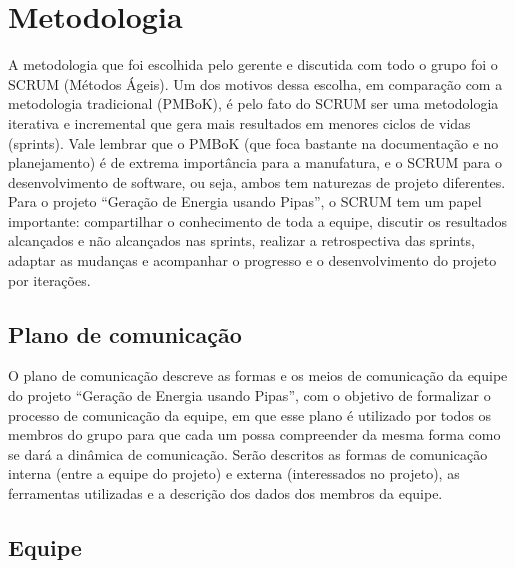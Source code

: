 \chapter[Metodologia]{Metodologia}

A metodologia que foi escolhida pelo gerente e discutida com todo o grupo foi o SCRUM (Métodos Ágeis). Um dos motivos dessa escolha, em comparação com a metodologia tradicional (PMBoK), é pelo fato do SCRUM ser uma metodologia iterativa e incremental que gera mais resultados em menores ciclos de vidas (sprints). Vale lembrar que o PMBoK (que foca bastante na documentação e no planejamento) é de extrema importância para a manufatura, e o SCRUM para o desenvolvimento de software, ou seja, ambos tem naturezas de projeto diferentes. Para o projeto “Geração de Energia usando Pipas”, o SCRUM tem um papel importante: compartilhar o conhecimento de toda a equipe, discutir os resultados alcançados e não alcançados nas sprints, realizar a retrospectiva das sprints, adaptar as mudanças e acompanhar o progresso e o desenvolvimento do projeto por iterações.

\section{Plano de comunicação}

O plano de comunicação descreve as formas e os meios de comunicação da equipe do projeto “Geração de Energia usando Pipas”, com o objetivo de formalizar o processo de comunicação da equipe, em que esse plano é utilizado por todos os membros do grupo para que cada um possa compreender da mesma forma como se dará a dinâmica de comunicação. Serão descritos as formas de comunicação interna (entre a equipe do projeto) e externa (interessados no projeto), as ferramentas utilizadas e a descrição dos dados dos membros da equipe.

\section{Equipe}

